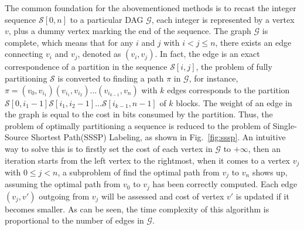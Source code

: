 \documentclass[runningheads]{comsis2}
\begin{document}
The common foundation for the abovementioned methods is to recast the integer sequence $\mathcal{S} \left[ 0, n \right]$ to a particular DAG $\mathcal{G}$, each integer is represented by a vertex $ v $, plus a dummy vertex marking the end of the sequence.
The graph $\mathcal{G}$ is complete, which means that for any $i$ and $j$ with $i < j \leqslant n$, there exists an edge connecting $v_{i}$ and $v_{j}$, denoted as $\left( v_{i}, v_{j} \right)$.
In fact, the edge is an exact correspondence of a partition in the sequence $\mathcal{S}\left[i, j \right] $, the problem of fully partitioning $\mathcal{S}$ is converted to finding a path $\pi$ in $\mathcal{G}$, for instance, $\pi=\left( v_{0}, v_{i_{1}} \right) \left( v_{i_{1}}, v_{i_{2}} \right)\ldots\left( v_{i_{k-1}}, v_{n} \right)$ with $k$ edges corresponds to the partition $\mathcal{S}\left[0, i_{1}-1 \right]\mathcal{S}\left[i_{1}, i_{2}-1 \right] \ldots\mathcal{S}\left[i_{k-1}, n-1\right] $ of $k$ blocks.
The weight of an edge in the graph is equal to the cost in bits consumed by the partition.
Thus, the problem of optimally partitioning a sequence is reduced to the problem of Single-Source Shortest Path(SSSP) Labeling, as shown in Fig.~\ref{fig:sssp}.
An intuitive way to solve this is to firstly set the cost of each vertex in $\mathcal{G}$ to $+\infty$, then an iteration starts from the left vertex to the rightmost, when it comes to a vertex $v_{j}$ with $0\leqslant j < n$, a subproblem of find the optimal path from $v_{j}$ to $v_{n}$ shows up, assuming the optimal path from $v_{0}$ to $v_{j}$ has been correctly computed.
Each edge $\left( v_{j}, v' \right)$ outgoing from $v_{j}$ will be assessed and cost of vertex $v'$ is updated if it becomes smaller.
As can be seen, the time complexity of this algorithm is proportional to the number of edges in $\mathcal{G}$.
\end{document}
